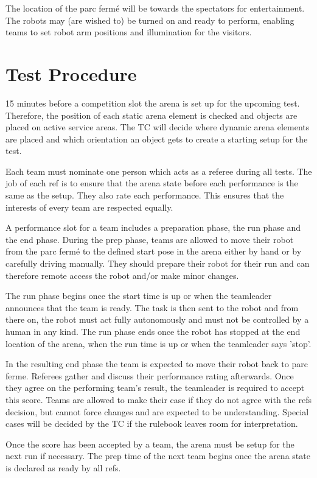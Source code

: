 The location of the parc fermé will be towards the spectators for entertainment.
The robots may (are wished to) be turned on and ready to perform, enabling teams to set robot arm positions and illumination for the visitors.

\section{Test Procedure}

15 minutes before a competition slot the arena is set up for the upcoming test.
Therefore, the position of each static arena element is checked and objects are placed on active 
service areas.
The TC will decide where dynamic arena elements are placed 
and which orientation an object gets to create a starting setup for the test.
 
Each team must nominate one person which acts as a referee during all tests.
The job of each ref is to ensure that the arena state before each performance is the same as the setup.
They also rate each performance. This ensures that the interests of every team are respected equally.

A performance slot for a team includes a preparation phase, the run phase and the end phase.
During the prep phase, teams are allowed to move their robot from the parc fermé to the defined start pose in the arena either by hand or by carefully driving manually. They should prepare their robot for their run and can therefore remote access the robot and/or make minor changes.

The run phase begins once the start time is up or when the teamleader announces that the team is ready. 
The task is then sent to the robot and from there on, the robot must act fully autonomously and must not be controlled by a human in any kind.
The run phase ends once the robot has stopped at the end location of the arena, when the run time is up or when the teamleader says 'stop'.

In the resulting end phase the team is expected to move their robot back to parc ferme.
Referees gather and discuss their performance rating afterwards.
Once they agree on the performing team's result, 
the teamleader is required to accept this score. 
Teams are allowed to make their case if they do not agree with the refs decision,
but cannot force changes and are expected to be understanding.
Special cases will be decided by the TC if the rulebook leaves room for interpretation.

Once the score has been accepted by a team,
the arena must be setup for the next run if necessary.
The prep time of the next team begins once the arena state is declared as ready by all refs.

